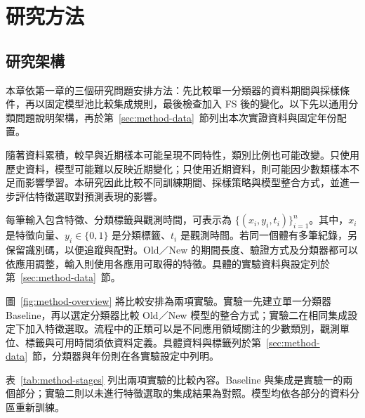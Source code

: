 \chapter{研究方法}\label{chap:method}
\begingroup
\setlength{\emergencystretch}{2em}

\section{研究架構}\label{sec:method-framework}

本章依第一章的三個研究問題安排方法：先比較單一分類器的資料期間與採樣條件，再以固定模型池比較集成規則，最後檢查加入 FS 後的變化。以下先以通用分類問題說明架構，再於第~\ref{sec:method-data}~節列出本次實證資料與固定年份配置。

隨著資料累積，較早與近期樣本可能呈現不同特性，類別比例也可能改變。只使用歷史資料，模型可能難以反映近期變化；只使用近期資料，則可能因少數類樣本不足而影響學習。本研究因此比較不同訓練期間、採樣策略與模型整合方式，並進一步評估特徵選取對預測表現的影響。

每筆輸入包含特徵、分類標籤與觀測時間，可表示為 \(\{(x_i,y_i,t_i)\}_{i=1}^{n}\)。其中，\(x_i\) 是特徵向量、\(y_i\in\{0,1\}\) 是分類標籤、\(t_i\) 是觀測時間。若同一個體有多筆紀錄，另保留識別碼，以便追蹤與配對。Old／New 的期間長度、驗證方式及分類器都可以依應用調整，輸入則使用各應用可取得的特徵。具體的實驗資料與設定列於第~\ref{sec:method-data}~節。

圖~\ref{fig:method-overview} 將比較安排為兩項實驗。實驗一先建立單一分類器 Baseline，再以選定分類器比較 Old／New 模型的整合方式；實驗二在相同集成設定下加入特徵選取。流程中的正類可以是不同應用領域關注的少數類別，觀測單位、標籤與可用時間須依資料定義。具體資料與標籤列於第~\ref{sec:method-data}~節，分類器與年份則在各實驗設定中列明。

表~\ref{tab:method-stages} 列出兩項實驗的比較內容。Baseline 與集成是實驗一的兩個部分；實驗二則以未進行特徵選取的集成結果為對照。模型均依各部分的資料分區重新訓練。

